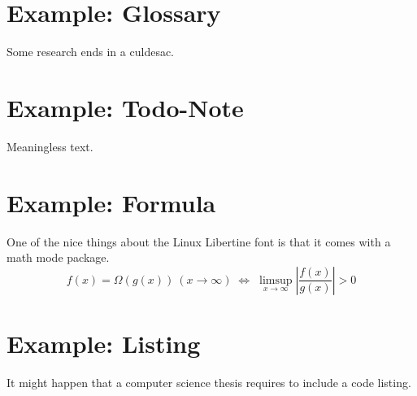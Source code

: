\section{Example: Glossary}
Some research ends in a \gls{culdesac}.

\section{Example: Todo-Note}
Meaningless text.

\section{Example: Formula}
One of the nice things about the Linux Libertine font is that it comes with
a math mode package.
\begin{displaymath}
f(x)=\Omega(g(x))\ (x\rightarrow\infty)\;\Leftrightarrow\;
\limsup_{x \to \infty} \left|\frac{f(x)}{g(x)}\right|> 0
\end{displaymath}

\section{Example: Listing}
It might happen that a computer science thesis requires to include a code listing.


